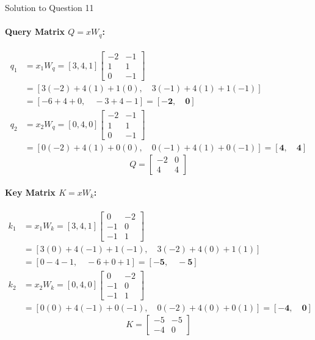 \documentclass[11pt,a4paper]{article}
\begin{document}
\begin{solutionbox}{Solution to Question 11}
\paragraph{Query Matrix $Q = x W_q$:}
\begin{align*}
q_{1} &= x_1 W_q = [3, 4, 1] \begin{bmatrix} -2 & -1 \\ 1 & 1 \\ 0 & -1 \end{bmatrix} \\
&= [3(-2) + 4(1) + 1(0), \quad 3(-1) + 4(1) + 1(-1)] \\
&= [-6 + 4 + 0, \quad -3 + 4 - 1] = \mathbf{[-2, \quad 0]} \\[0.2cm]
q_{2} &= x_2 W_q = [0, 4, 0] \begin{bmatrix} -2 & -1 \\ 1 & 1 \\ 0 & -1 \end{bmatrix} \\
&= [0(-2) + 4(1) + 0(0), \quad 0(-1) + 4(1) + 0(-1)] = \mathbf{[4, \quad 4]}
\end{align*}
\[
Q = \begin{bmatrix} -2 & 0 \\ 4 & 4 \end{bmatrix}
\]

\paragraph{Key Matrix $K = x W_k$:}
\begin{align*}
k_{1} &= x_1 W_k = [3, 4, 1] \begin{bmatrix} 0 & -2 \\ -1 & 0 \\ -1 & 1 \end{bmatrix} \\
&= [3(0) + 4(-1) + 1(-1), \quad 3(-2) + 4(0) + 1(1)] \\
&= [0 - 4 - 1, \quad -6 + 0 + 1] = \mathbf{[-5, \quad -5]} \\[0.2cm]
k_{2} &= x_2 W_k = [0, 4, 0] \begin{bmatrix} 0 & -2 \\ -1 & 0 \\ -1 & 1 \end{bmatrix} \\
&= [0(0) + 4(-1) + 0(-1), \quad 0(-2) + 4(0) + 0(1)] = \mathbf{[-4, \quad 0]}
\end{align*}
\[
K = \begin{bmatrix} -5 & -5 \\ -4 & 0 \end{bmatrix}
\]


\end{solutionbox}
\end{document}
